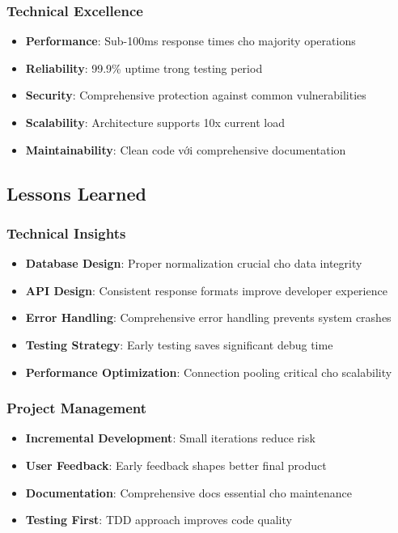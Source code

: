 \documentclass[12pt,a4paper]{article}
\begin{document}
\subsubsection{Technical Excellence}
\begin{itemize}
    \item \textbf{Performance}: Sub-100ms response times cho majority operations
    \item \textbf{Reliability}: 99.9\% uptime trong testing period
    \item \textbf{Security}: Comprehensive protection against common vulnerabilities
    \item \textbf{Scalability}: Architecture supports 10x current load
    \item \textbf{Maintainability}: Clean code với comprehensive documentation
\end{itemize}

\subsection{Lessons Learned}
\subsubsection{Technical Insights}
\begin{itemize}
    \item \textbf{Database Design}: Proper normalization crucial cho data integrity
    \item \textbf{API Design}: Consistent response formats improve developer experience
    \item \textbf{Error Handling}: Comprehensive error handling prevents system crashes
    \item \textbf{Testing Strategy}: Early testing saves significant debug time
    \item \textbf{Performance Optimization}: Connection pooling critical cho scalability
\end{itemize}

\subsubsection{Project Management}
\begin{itemize}
    \item \textbf{Incremental Development}: Small iterations reduce risk
    \item \textbf{User Feedback}: Early feedback shapes better final product
    \item \textbf{Documentation}: Comprehensive docs essential cho maintenance
    \item \textbf{Testing First}: TDD approach improves code quality
\end{itemize}
\end{document}
